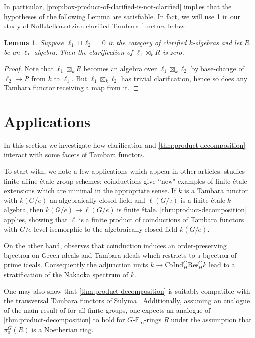 \documentclass[11pt,dvipsnames]{amsart}
\newtheorem{lemma}[theorem]{Lemma}
\theoremstyle{BoldRemark}
\newcommand{\Res}{\mathrm{Res}}
\newcommand{\Coind}{\mathrm{CoInd}}
\begin{document}
In particular, \cref{prop:box-product-of-clarified-is-not-clarified} implies that the hypotheses of the following Lemma are satisfiable. In fact, we will use \cref{lem:admitting-maps-from-two-things-implies-zero} in our study of Nullstellensatzian clarified Tambara functors below.

\begin{lemma}\label{lem:admitting-maps-from-two-things-implies-zero}
	Suppose $\ell_1 \sqcup \ell_2 = 0$ in the category of clarified $k$-algebras and let $R$ be an $\ell_2$-algebra. Then the clarification of $\ell_1 \boxtimes_k R$ is zero.
\end{lemma}

\begin{proof}
	Note that $\ell_1 \boxtimes_k R$ becomes an algebra over $\ell_1 \boxtimes_k \ell_2$ by base-change of $\ell_2 \rightarrow R$ from $k$ to $\ell_1$. But $\ell_1 \boxtimes_k \ell_2$ has trivial clarification, hence so does any Tambara functor receiving a map from it.
\end{proof}

\section{Applications}

In this section we investigate how clarification and \cref{thm:product-decomposition} interact with some facets of Tambara functors.

To start with, we note a few applications which appear in other articles. \cite{Wis25c} studies finite affine \'{e}tale group schemes; coinductions give ``new" examples of finite \'{e}tale extensions which are minimal in the appropriate sense. If $k$ is a Tambara functor with $k(G/e)$ an algebraically closed field and $\ell(G/e)$ is a finite \'{e}tale $k$-algebra, then $k(G/e) \rightarrow \ell(G/e)$ is finite \'{e}tale. \cref{thm:product-decomposition} applies, showing that $\ell$ is a finite product of coinductions of Tambara functors with $G/e$-level isomorphic to the algebraically closed field $k(G/e)$. 

On the other hand, \cite{Wis25b} observes that coinduction induces an order-preserving bijection on Green ideals and Tambara ideals which restricts to a bijection of prime ideals. Consequently the adjunction units $k \rightarrow \Coind_H^G \Res_H^G k$ lead to a stratification of the Nakaoka spectrum of $k$.

One may also show that \cref{thm:product-decomposition} is suitably compatible with the transversal Tambara functors of Sulyma \cite{Sul23}. Additionally, assuming an analogue of the main result of \cite{Yan25} for all finite groups, one expects an analogue of \cref{thm:product-decomposition} to hold for $G$-$\mathbb{E}_\infty$-rings $R$ under the assumption that $\pi_0^G(R)$ is a Noetherian ring.
\end{document}

